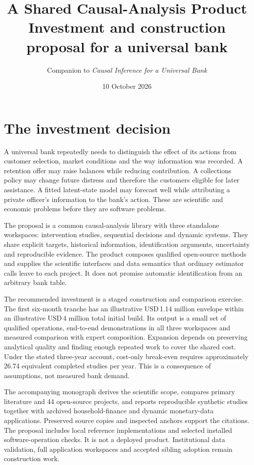 \documentclass[11pt,a4paper,openany]{book}
\title{\sffamily\bfseries\color{ink}A Shared Causal-Analysis Product\\[14pt]
\Large Investment and construction proposal for a universal bank}
\author{Companion to \textit{Causal Inference for a Universal Bank}}
\date{10 October 2026}
\begin{document}
\frontmatter
\maketitle
\chapter*{The investment decision}

A universal bank repeatedly needs to distinguish the effect of its actions
from customer selection, market conditions and the way information was
recorded. A retention offer may raise balances while reducing contribution.
A collections policy may change future distress and therefore the customers
eligible for later assistance. A fitted latent-state model may forecast well
while attributing a private officer's information to the bank's action.
These are scientific and economic problems before they are software problems.

The proposal is a common causal-analysis library with three standalone
workspaces: intervention studies, sequential decisions and dynamic systems.
They share explicit targets, historical information, identification
arguments, uncertainty and reproducible evidence. The product composes
qualified open-source methods and supplies the scientific interfaces and
data semantics that ordinary estimator calls leave to each project.
It does not promise automatic identification from an arbitrary bank table.

The recommended investment is a staged construction and comparison exercise.
The first six-month tranche has an illustrative USD\,1.14 million envelope
within an illustrative USD\,4 million total initial build. Its output is a
small set of qualified operations, end-to-end demonstrations in all three
workspaces and measured comparison with expert composition. Expansion
depends on preserving analytical quality and finding enough repeated work
to cover the shared cost. Under the stated three-year account, cost-only
break-even requires approximately 26.74 equivalent completed studies per year.
This is a consequence of assumptions, not measured bank demand.

The accompanying monograph derives the scientific scope, compares primary
literature and 44 open-source projects, and reports reproducible synthetic
studies together with archived household-finance and dynamic monetary-data
applications.
Preserved source copies and inspected anchors support the citations.
The proposal includes local reference implementations and selected installed
software-operation checks. It is not a deployed product. Institutional data
validation, full application workspaces and accepted sibling adoption remain
construction work.
\end{document}
